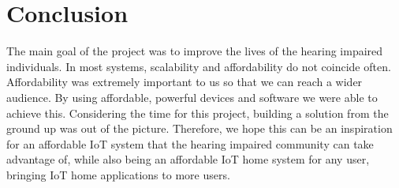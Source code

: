 \chapter{Conclusion}

The main goal of the project was to improve the lives of the hearing impaired individuals. In most systems, scalability and affordability do not coincide often. Affordability was extremely important to us so that we can reach a wider audience. By using affordable, powerful devices and software we were able to achieve this. Considering the time for this project, building a solution from the ground up was out of the picture. Therefore, we hope this can be an inspiration for an affordable IoT system that the hearing impaired community can take advantage of, while also being an affordable IoT home system for any user, bringing IoT home applications to more users. 